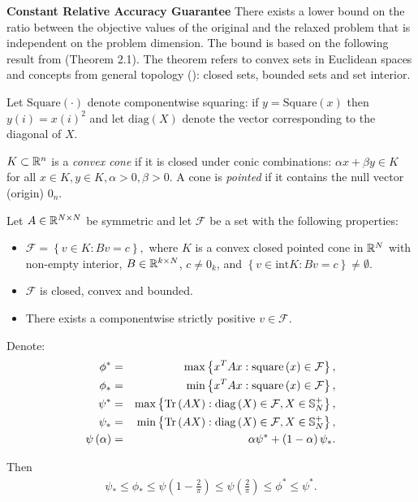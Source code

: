 \noindent\textbf{Constant Relative Accuracy Guarantee}
There exists a lower bound on the ratio between the objective values of the original
and the relaxed problem that is independent on the problem dimension. The bound is
based on the following result from \cite{Nesterov98globalquadratic} (Theorem 2.1).
The theorem refers to convex sets in Euclidean spaces \cite{Boyd:2004:CO:993483} and
concepts from general topology (\cite{bourbaki1998general}): closed sets,
bounded sets and set interior.
\begin{notation}
Let $\mathrm{Square}(\cdot)$ denote componentwise squaring: if
$y = \mathrm{Square}(x)$ then $y(i) = x(i)^2$ and let $\mathrm{diag}(X)$
denote the vector corresponding to the diagonal of $X$.
\end{notation}
\begin{definition}
$K \subset \mathbb{R}^n$ is a \emph{convex cone} if it is closed under conic combinations:
$\alpha x + \beta y \in K$ for all $x \in K, y \in K, \alpha > 0, \beta > 0$.
A cone is \emph{pointed} if it contains the null vector (origin) $0_n$.
\end{definition}

\begin{theorem}\label{thm:nesterov}
Let $A \in \mathbb{R}^{N \times N}$ be symmetric and let $\mathcal{F}$ be a set with the following properties:
\begin{itemize}
\item $\mathcal{F} = \left\{ v \in K: B v = c  \right\},$ where $K$ is a convex closed pointed
cone in $\mathbb{R}^N$ with non-empty interior, $B \in \mathbb{R}^{k\times N}$, $c \neq 0_k$, and
$\left\{  v \in \mathrm{int}K : B v = c \right\} \neq \emptyset$.
\item $\mathcal{F}$ is closed, convex and bounded.
\item There exists a componentwise strictly positive $v \in \mathcal{F}$.

\end{itemize}
Denote:
\begin{align*}
\phi^* &=& \mathrm{max}\left\{  x^T A x : \mathrm{square}\left(x\right) \in \mathcal{F}  \right\},\\
\phi_* &=& \mathrm{min}\left\{  x^T A x : \mathrm{square}\left(x\right) \in \mathcal{F}  \right\},\\
\psi^* &=& \mathrm{max}\left\{  \mathrm{Tr}\left(A X\right): \mathrm{diag}\left(X\right) \in \mathcal{F}, X \in \mathbb{S}_N^+  \right\},\\
\psi_* &=& \mathrm{min}\left\{  \mathrm{Tr}\left(A X\right): \mathrm{diag}\left(X\right) \in \mathcal{F}, X \in \mathbb{S}_N^+  \right\},\\
\psi \left(\alpha\right) &=& \alpha \psi^* + \left(1-\alpha\right)\psi_*.
\end{align*}

Then
\begin{equation}\label{eq:sdpBound}
\begin{aligned}
\psi_* \leq \phi_* \leq \psi \left(1 - \frac{2}{\pi}\right) \leq \psi\left(\frac{2}{\pi}\right) \leq \phi^* \leq \psi^*.
\end{aligned}
\end{equation}
\end{theorem}

